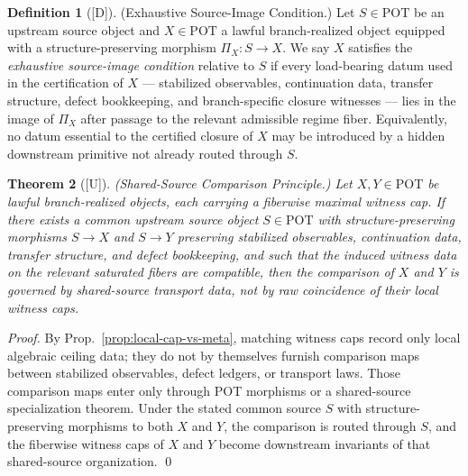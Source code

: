 \documentclass[12pt,oneside]{amsbook}
\theoremstyle{plain}
\newtheorem{theorem}{Theorem}[section]
\theoremstyle{definition}
\newtheorem{definition}[theorem]{Definition}
\theoremstyle{remark}
\newcommand{\status}[1]{\textup{[#1]}}
\begin{document}
\begin{definition}[\status{D}]\label{def:exhaustive-source-image}
\textup{(Exhaustive Source-Image Condition.)}
Let $S \in \mathrm{POT}$ be an upstream source object and $X \in
\mathrm{POT}$ a lawful branch-realized object equipped with a
structure-preserving morphism $\Pi_X : S \to X$.  We say $X$
satisfies the \emph{exhaustive source-image condition} relative to
$S$ if every load-bearing datum used in the certification of $X$ ---
stabilized observables, continuation data, transfer structure, defect
bookkeeping, and branch-specific closure witnesses --- lies in the
image of $\Pi_X$ after passage to the relevant admissible regime
fiber.  Equivalently, no datum essential to the certified closure of
$X$ may be introduced by a hidden downstream primitive not already
routed through $S$.
\end{definition}

\begin{theorem}[\status{U}]\label{thm:shared-source-comparison}
\textup{(Shared-Source Comparison Principle.)}
Let $X, Y \in \mathrm{POT}$ be lawful branch-realized objects, each
carrying a fiberwise maximal witness cap.  If there exists a common
upstream source object $S \in \mathrm{POT}$ with
structure-preserving morphisms $S \to X$ and $S \to Y$ preserving
stabilized observables, continuation data, transfer structure, and
defect bookkeeping, and such that the induced witness data on the
relevant saturated fibers are compatible, then the comparison of $X$
and $Y$ is governed by shared-source transport data, not by raw
coincidence of their local witness caps.
\end{theorem}

\begin{proof}
By Prop.~\ref{prop:local-cap-vs-meta}, matching witness caps record
only local algebraic ceiling data; they do not by themselves furnish
comparison maps between stabilized observables, defect ledgers, or
transport laws.  Those comparison maps enter only through POT
morphisms or a shared-source specialization theorem.  Under the
stated common source $S$ with structure-preserving morphisms to both
$X$ and $Y$, the comparison is routed through $S$, and the fiberwise
witness caps of $X$ and $Y$ become downstream invariants of that
shared-source organization. \qed
\end{proof}
\end{document}
